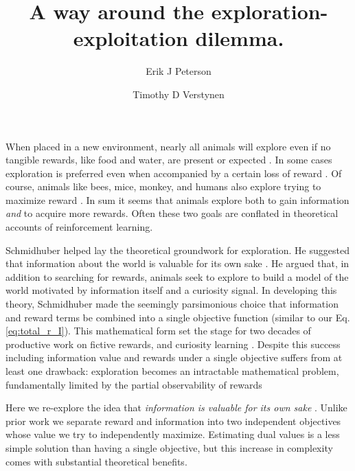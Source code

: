 \documentclass[9pt,twocolumn,twoside]{pnas-new}
\title{A way around the exploration-exploitation dilemma.}
\author[a,1]{Erik J Peterson}
\author[a,b]{Timothy D Verstynen}
\affil[a]{Department of Psychology}
\affil[b]{Center for the Neural Basis of Cognition, Carnegie Mellon University, Pittsburgh PA}
\begin{document}
\verticaladjustment{-2pt}
\maketitle


\thispagestyle{firststyle}
When placed in a new environment, nearly all animals will explore even if no tangible rewards, like food and water, are present or expected \cite{Liu2019,Jaegle,Todd2015}. In some cases exploration is preferred even when accompanied by a certain loss of reward \cite{ZheWang2019}. Of course, animals like bees, mice, monkey, and humans also explore trying to maximize reward \cite{Todd2015}. In sum it seems that animals explore both to gain information \textit{and} to acquire more rewards. Often these two goals are conflated in theoretical accounts of reinforcement learning.

Schmidhuber helped lay the theoretical groundwork for exploration. He suggested that information about the world is valuable for its own sake \cite{Schmidhuber1991}. He argued that, in addition to searching for rewards, animals seek to explore to build a model of the world motivated by information itself and a curiosity signal. In developing this theory, Schmidhuber made the seemingly parsimonious choice that information and reward terms be combined into a single objective function (similar to our Eq.\ref{eq:total_r_I}). This mathematical form set the stage for two decades of productive work on fictive rewards, and curiosity learning \cite{Pathak2017,Sutton1990,dayan1996exploration}. Despite this success including information value and rewards under a single objective suffers from at least one drawback: exploration becomes an intractable mathematical problem, fundamentally limited by the partial observability of rewards \cite{thrun1992active,dayan1996exploration,findling2018computational,gershman2018deconstructing} 

Here we re-explore the idea that \textit{information is valuable for its own sake} \cite{Schmidhuber1991}. Unlike prior work we separate reward and information into two independent objectives whose value we try to independently maximize. Estimating dual values is a less simple solution than having a single objective, but this increase in complexity comes with substantial theoretical benefits.
\end{document}
